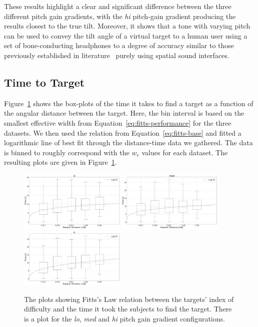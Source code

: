\documentclass[format=sigconf, review=true, screen=true, anonymous=true]{acmart}
\begin{document}
These results highlight a clear and significant difference between the three different pitch gain gradients, with the \emph{hi} pitch-gain gradient producing the results closest to the true tilt. Moreover, it shows that a tone with varying pitch can be used to convey the tilt angle of a virtual target to a human user using a set of bone-conducting headphones to a degree of accuracy similar to those previously established in literature~\cite{bujacz2011sonification, katz2011spatial, zotkin2004rendering} purely using spatial sound interfaces.

\subsection{Time to Target}

Figure~\ref{fig:fitts} shows the box-plots of the time it takes to find a target as a function of the angular distance between the target. Here, the bin interval is based on the smallest effective width from Equation~\ref{eq:fitts-performance} for the three datasets. We then used the relation from Equation~\ref{eq:fitts-base} and fitted a logarithmic line of best fit through the distance-time data we gathered. The data is binned to roughly correspond with the $w_e$ values for each dataset. The resulting plots are given in Figure~\ref{fig:fitts}. 

\begin{figure}
  \centering
  \includegraphics[width=0.45\textwidth]{figures/fitts_lo.png}
  \includegraphics[width=0.45\textwidth]{figures/fitts_med.png}
  \includegraphics[width=0.45\textwidth]{figures/fitts_hi.png}
  \caption{The plots showing Fitts's Law relation between the targets' index of difficulty and the time it took the subjects to find the target. There is a plot for the \emph{lo}, \emph{med} and \emph{hi} pitch gain gradient configurations.} 
  \label{fig:fitts}
\end{figure}
\end{document}
